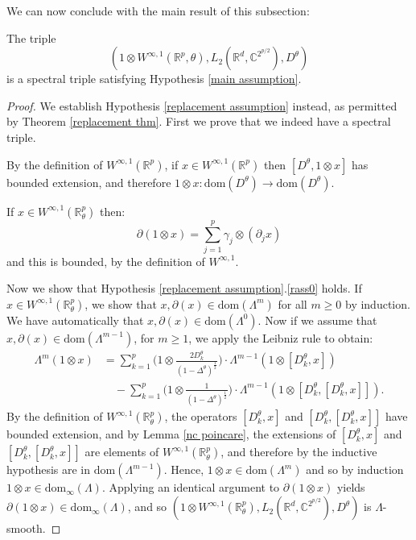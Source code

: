     We can now conclude with the main result of this subsection:
    \begin{thm}
        The triple
        \begin{equation*}
            (1\otimes W^{\infty,1}(\mathbb{R}^p,\theta),L_2(\mathbb{R}^d,\mathbb{C}^{2^{p/2}}),D^\theta)
        \end{equation*}
        is a spectral triple satisfying Hypothesis \ref{main assumption}.
    \end{thm}
    \begin{proof}
        We establish Hypothesis \ref{replacement assumption} instead, as permitted by Theorem \ref{replacement thm}. 
        First we prove that we indeed have a spectral triple. 
        
        By the definition of $W^{\infty,1}(\mathbb{R}^p)$, if $x \in W^{\infty,1}(\mathbb{R}^p)$ then $[D^\theta,1\otimes x]$
        has bounded extension, and therefore $1\otimes x:\mathrm{dom}(D^\theta)\to \mathrm{dom}(D^\theta)$.
        
        
        If $x \in W^{\infty,1}(\mathbb{R}^p_\theta)$ then:
        \begin{equation*}
            \partial(1\otimes x) = \sum_{j=1}^p \gamma_j\otimes (\partial_jx)
        \end{equation*}
        and this is bounded, by the definition of $W^{\infty,1}$.        
        
        Now we show that Hypothesis \ref{replacement assumption}.\eqref{rass0} holds.
        If $x \in W^{\infty,1}(\mathbb{R}^p_\theta)$, we show that $x,\partial(x) \in \mathrm{dom}(\Lambda^m)$ for all $m\geq 0$ by induction. We have automatically that $x,\partial(x) \in \mathrm{dom}(\Lambda^0)$. Now if we assume that $x,\partial(x) \in \mathrm{dom}(\Lambda^{m-1})$, for $m \geq 1$, we apply the Leibniz rule to obtain:
        \begin{align*}
            \Lambda^m(1\otimes x) &= \sum_{k=1}^p\Big(1\otimes \frac{2D_k^\theta}{(1-\Delta^\theta)^{\frac12}}\Big)\cdot \Lambda^{m-1}(1\otimes [D_k^\theta,x])\\
                                  &\quad-\sum_{k=1}^p\Big(1\otimes\frac1{(1-\Delta^\theta)^{\frac12}}\Big)\cdot \Lambda^{m-1}(1\otimes [D_k^\theta,[D_k^\theta,x]]).
        \end{align*}
        By the definition of $W^{\infty,1}(\mathbb{R}^p_\theta)$, the operators $[D_k^\theta,x]$ and $[D_k^\theta,[D_k^\theta,x]]$ have bounded extension, and by Lemma \ref{nc poincare}, the extensions of $[D_k^\theta,x]$ and $[D_k^\theta,[D_k^\theta,x]]$ are elements of $W^{\infty,1}(\mathbb{R}^p_\theta)$, and therefore by the inductive hypothesis are in $\mathrm{dom}(\Lambda^{m-1})$. Hence, $1\otimes x \in \mathrm{dom}(\Lambda^m)$ and so by induction $1\otimes x \in \mathrm{dom}_\infty(\Lambda)$. Applying an identical argument to $\partial(1\otimes x)$ yields $\partial(1\otimes x) \in \mathrm{dom}_\infty(\Lambda)$, and so $(1\otimes W^{\infty,1}(\mathbb{R}^p_\theta),L_2(\mathbb{R}^d,\mathbb{C}^{2^{p/2}}),D^\theta)$ is $\Lambda$-smooth.        
        

\end{proof}
